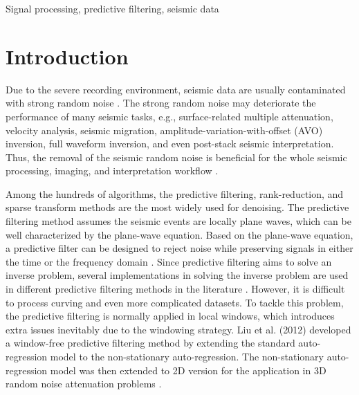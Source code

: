 \begin{keywords}
Signal processing, predictive filtering, seismic data
\end{keywords}

\section{Introduction}
Due to the severe recording environment, seismic data are usually contaminated with strong random noise \cite{wangchong2019hankel,zhaoqiang2019tgrs,baimin2019tgrs,zhangmi2019}. The strong random noise may deteriorate the performance of many seismic tasks, e.g., surface-related multiple attenuation, velocity analysis, seismic migration, amplitude-variation-with-offset (AVO) inversion, full waveform inversion, and even post-stack seismic interpretation. Thus, the removal of the seismic random noise is beneficial for the whole seismic processing, imaging, and interpretation workflow \cite{hongbo2014,yanan2014,yu2017complex,li2018seismic,liu2019seismic,liuwei2019ewt}.  

Among the hundreds of algorithms, the predictive filtering, rank-reduction, and sparse transform methods are the most widely used for denoising. The predictive filtering method assumes the seismic events are locally plane waves, which can be well characterized by the plane-wave equation. Based on the plane-wave equation, a predictive filter can be designed to reject noise while preserving signals in either the time or the frequency domain \cite{abma1995}.  Since predictive filtering aims to solve an inverse problem, several implementations in solving the inverse problem are used in different predictive filtering methods in the literature \cite{canales1984,gulunay1986fxdecon}. However, it is difficult to process curving and even more complicated datasets. To tackle this problem, the predictive filtering is normally applied in local windows, which introduces extra issues inevitably due to the windowing strategy. Liu et al. (2012) \cite{guochang2012} developed a window-free predictive filtering method by extending the standard auto-regression model to the non-stationary auto-regression. The non-stationary auto-regression model was then extended to 2D version for the application in 3D random noise attenuation problems \cite{guochang2013}. 


